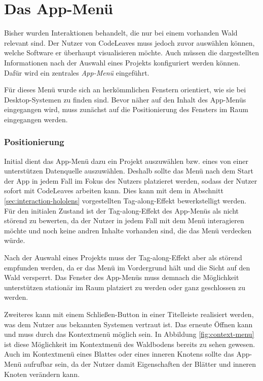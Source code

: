 \section{Das App-Menü}

Bisher wurden Interaktionen behandelt, die nur bei einem vorhanden Wald relevant sind. Der Nutzer von CodeLeaves muss jedoch zuvor auswählen können, welche Software er überhaupt visualisieren möchte. Auch müssen die dargestellten Informationen nach der Auswahl eines Projekts konfiguriert werden können. Dafür wird ein zentrales \textit{App-Menü} eingeführt.

Für dieses Menü wurde sich an herkömmlichen Fenstern orientiert, wie sie bei Desktop-Systemen zu finden sind. Bevor näher auf den Inhalt des App-Menüs eingegangen wird, muss zunächst auf die Positionierung des Fensters im Raum eingegangen werden.

\subsubsection*{Positionierung}

Initial dient das App-Menü dazu ein Projekt auszuwählen bzw. eines von einer unterstützen Datenquelle auszuwählen. Deshalb sollte das Menü nach dem Start der App in jedem Fall im Fokus des Nutzers platzieret werden, sodass der Nutzer sofort mit CodeLeaves arbeiten kann. Dies kann mit dem in Abschnitt \ref{sec:interaction-hololens} vorgestellten Tag-along-Effekt bewerkstelligt werden. Für den initialen Zustand ist der Tag-along-Effekt des App-Menüs als nicht störend zu bewerten, da der Nutzer in jedem Fall mit dem Menü interagieren möchte und noch keine andren Inhalte vorhanden sind, die das Menü verdecken würde.

Nach der Auswahl eines Projekts muss der Tag-along-Effekt aber als störend empfunden werden, da er das Menü im Vordergrund hält und die Sicht auf den Wald versperrt. Das Fenster des App-Menüs muss demnach die Möglichkeit unterstützen stationär im Raum platziert zu werden oder ganz geschlossen zu werden.

Zweiteres kann mit einem Schließen-Button in einer Titelleiste realisiert werden, was dem Nutzer aus bekannten Systemen vertraut ist. Das erneute Öffnen kann und muss durch das Kontextmenü möglich sein. In Abbildung \ref{fig:context-menu} ist diese Möglichkeit im Kontextmenü des Waldbodens bereits zu sehen gewesen. Auch im Kontextmenü eines Blattes oder eines inneren Knotens sollte das App-Menü aufrufbar sein, da der Nutzer damit Eigenschaften der Blätter und inneren Knoten verändern kann.

